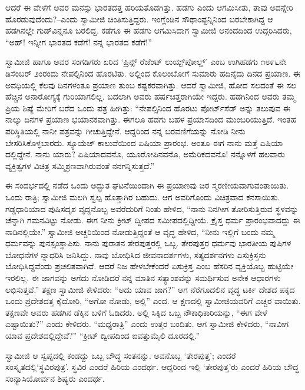 ಆದರೆ ಈ ವೇಳೆಗೆ ಅವರ ಮನಸ್ಸು ಭಾರತದತ್ತ ಹರಿಯತೊಡಗಿತ್ತು. ಹಡಗು ಎಂದು ಆಗಮಿಸೀತು, ತಾವು ಅದನ್ನೇರಿ ಹೊರಡುವುದೆಂದು?–ಎಂದು ಸ್ವಾಮೀಜಿ ಚಿಂತಿಸುತ್ತಿದ್ದರು. ಇಂಗ್ಲೆಂಡಿನ ಸೌಥಾಂಪ್ಟನ್ನಿನಿಂದ ಬರಬೇಕಾಗಿದ್ದ ಆ ಹಡಗಿನಲ್ಲೇ ಗುಡ್​ವಿನ್ನನೂ ಬರಲಿದ್ದ. ಕಡೆಗೂ ಈ ಹಡಗು ಆಗಮಿಸಿದಾಗ ಸ್ವಾಮೀಜಿ ಆನಂದದಿಂದ ಉದ್ಗರಿಸಿದರು, “ಅಹ್! ಇನ್ನೀಗ ಭಾರತದ ಕಡೆಗೆ! ನನ್ನ ಭಾರತದ ಕಡೆಗೆ!”

ಸ್ವಾಮೀಜಿ ಹಾಗೂ ಅವರ ಸಂಗಡಿಗರು ಏರಿದ ‘ಪ್ರಿನ್ಸ್ ರೆಜೆಂಟ್ ಲುಯ್ಟ್​ಪೋಲ್ಡ್​’ ಎಂಬ ಉಗಿಹಡಗು ೧೮೯೬ನೇ ಡಿಸೆಂಬರ್ ೨ಂರಂದು ನೇಪಲ್ಸಿನಿಂದ ಹೊರಟಿತು. ಅಲ್ಲಿಂದ ಕೊಲಂಬೋಗೆ ಸುಮಾರು ಹದಿನೈದು ದಿನದ ಪ್ರಯಾಣ. ಈ ಅವಧಿಯಲ್ಲಿ ಕೆಲವು ದಿನಗಳಂತೂ ಪ್ರಯಾಣ ತುಂಬ ಕಷ್ಟಕರವಾಗಿತ್ತು. ಆದರೆ ಸ್ವಾಮೀಜಿ, ಹೋದ ಸಲದಂತೆ ಈ ಸಲ ಹೆಚ್ಚಿನ ಅನಾರೋಗ್ಯಕ್ಕೆ ಗುರಿಯಾಗಲಿಲ್ಲ. ಬದಲಾಗಿ ಅವರು ಹರ್ಷಚಿತ್ತರಾಗಿಯೇ ಇದ್ದರು. ಹಡಗಿನಿಂದ ಅವರು ತಮ್ಮ ಪ್ರಿಯ ಶಿಷ್ಯೆ ಮೇರಿಗೆ ಬರೆದ ಒಂದು ಪತ್ರ ಹೀಗಿತ್ತು: “ನೇಪಲ್ಸಿನಿಂದ ಹೊರಟು ಪೋರ್ಟ್​ಸೆಡ್ ಅನ್ನು ತಲುಪುವ ಈ ನಾಲ್ಕು ದಿನಗಳ ಪ್ರಯಾಣ ಭಯಾನಕವಾಗಿತ್ತು. ಈಗಲೂ ಹಡಗು ಬಹಳ ಪ್ರಯಾಸದಿಂದ ಮುಂಬರಿಯುತ್ತಿದೆ. ಇಂತಹ ಪರಿಸ್ಥಿತಿಯಲ್ಲಿ ನಾನೀ ಪತ್ರವನ್ನು ಗೀಚುತ್ತಿದ್ದೇನೆ. ಆದ್ದರಿಂದ ನನ್ನ ಬರವಣಿಗೆಯನ್ನು ನೋಡಿ ನೀನು ಬೇಸರಿಸಿಕೊಳ್ಳಬಾರದು. ಸ್ಯೂಯೆಜ್ ಕಾಲುವೆಯಿಂದ ಏಷಿಯಾ ಪ್ರಾರಂಭ. ಅಂತೂ ಈಗ ನಾನು ಮತ್ತೆ ಏಷಿಯಾ ದಲ್ಲಿದ್ದೇನೆ. ನಾನು ಯಾರು? ಏಷಿಯಾದವನೊ, ಯೂರೋಪಿನವನೊ, ಅಮೆರಿಕದವನೊ! ನನ್ನೊಳಗೆ ಹಲವಾರು ವ್ಯಕ್ತಿತ್ವಗಳ ವಿಚಿತ್ರ ಸಮ್ಮಿಶ್ರಣವಾಗಿರುವಂತೆ ನನಗನ್ನಿಸುತ್ತದೆ.”

ಈ ಸಂದರ್ಭದಲ್ಲಿ ನಡೆದ ಒಂದು ಅದ್ಭುತ ಘಟನೆಯಿಂದಾಗಿ ಈ ಪ್ರಯಾಣವು ಚಿರ ಸ್ಮರಣೀಯವಾಗುವಂತಾಯಿತು. ಒಂದು ರಾತ್ರಿ; ಸ್ವಾಮೀಜಿ ಮಲಗಿ ಸ್ವಲ್ಪ ಹೊತ್ತಾಗಿರ ಬಹುದು. ಆಗ ಅವರಿಗೊಂದು ವಿಚಿತ್ರವಾದ ಕನಸಾಯಿತು. ಗಡ್ಡಧಾರಿಯಾದ ಪುಷಿಸದೃಶ ವೃದ್ದನೊಬ್ಬ ಅವರೆದುರಿಗೆ ನಿಂತು ಹೇಳಿದ, “ನಾನು ನಿನಗೀಗ ತೋರಿಸುತ್ತಿರುವ ಸ್ಥಳವನ್ನು ಚೆನ್ನಾಗಿ ಗಮನವಿಟ್ಟು ನೋಡು. ಈಗ ನೀನು ಕ್ರೀಟ್ ದ್ವೀಪದ ಸಮೀಪದಲ್ಲಿದ್ದೀಯೆ. ಕ್ರೈಸ್ತ ಧರ್ಮ ಪ್ರಾರಂಭವಾದದ್ದು ಈ ನಾಡಿನಲ್ಲಿಯೇ.” ಸ್ವಾಮೀಜಿ ಅಚ್ಚರಿಯಿಂದ ನೋಡುತ್ತಿದ್ದಂತೆ ಆ ವೃದ್ಧ ಹೇಳಿದ, “ನೀನು ಇಲ್ಲಿಗೆ ಬಂದು ನಮ್ಮ ಧರ್ಮವನ್ನು ಪುನಸ್ಸಂಸ್ಥಾಪಿಸು. ನಾನು ಪುರಾತನ ತೇರಪುತ್ತರಲ್ಲಿ ಒಬ್ಬ. ತೇರಪುತ್ತರ ಧರ್ಮವು ಭಾರತೀಯ ಪುಷಿಗಳ ಬೋಧನೆಗಳ ನ್ನಾಧರಿಸಿ ಜನಿಸಿದ್ದು. ನಾವು ಬೋಧಿಸಿದ ಜೀವನಾದರ್ಶಗಳು, ಸತ್ಯದರ್ಶನಗಳು ಏಸುಕ್ರಿಸ್ತನು ಬೋಧಿಸಿದ್ದವೆಂದು ಪ್ರಚಲಿತವಾಗಿವೆ. ಆದರೆ ನಿಜ ಹೇಳಬೇಕೆಂದರೆ ಏಸುಕ್ರಿಸ್ತ ಎಂಬ ಹೆಸರಿನ ವ್ಯಕ್ತಿಯೊಬ್ಬ ಹುಟ್ಟಿಯೇ ಇರಲಿಲ್ಲ. ಈ ಜಾಗವನ್ನು ಅಗೆದು ನೋಡಿದರೆ ನನ್ನ ಮಾತಿನ ಸತ್ಯಾಂಶವನ್ನು ಸಮರ್ಥಿಸುವ ಅನೇಕ ಆಧಾರಗಳು ಲಭಿಸುತ್ತವೆ.” ತಕ್ಷಣ ಸ್ವಾಮೀಜಿ ಕೇಳಿದರು: “ಅದು ಯಾವ ಜಾಗ?” ಆಗ ನೆರೆಗೂದಲಿನ ವೃದ್ಧ ಟರ್ಕಿ ದೇಶದ ಪಕ್ಕದ ಒಂದು ಪ್ರದೇಶದತ್ತ ಕೈದೋರಿ, “ಅಗೋ ನೋಡು, ಅಲ್ಲಿ” ಎಂದ. ಆ ಕ್ಷಣದಲ್ಲಿ ಸ್ವಾಮೀಜಿಯವರಿಗೆ ಎಚ್ಚರ ವಾಯಿತು. ತಕ್ಷಣವೇ ಅವರು ಹಡಗಿನ ಡೆಕ್ಕಿನ ಬಳಿಗೆ ಓಡಿದರು. ಅಲ್ಲಿ ಸಿಕ್ಕಿದ ಒಬ್ಬ ನೌಕಾಧಿಕಾರಿಯನ್ನು, “ಈಗ ವೇಳೆ ಎಷ್ಟಾಯಿತು?” ಎಂದು ಕೇಳಿದರು. “ಮಧ್ಯರಾತ್ರಿ” ಎಂದು ಉತ್ತರ ಬಂದಿತು. ಆಗ ಸ್ವಾಮೀಜಿ ಕೇಳಿದರು, “ನಾವೀಗ ಯಾವ ಪ್ರದೇಶದಲ್ಲಿದ್ದೇವೆ?” “ಕ್ರೀಟ್ ದ್ವೀಪದಿಂದ ಐವತ್ತುಮೈಲಿ ದೂರದಲ್ಲಿ.”

ಸ್ವಾಮೀಜಿ ಆ ಸ್ವಪ್ನದಲ್ಲಿ ಕಂಡದ್ದು ಒಬ್ಬ ಬೌದ್ಧ ಸಂತನನ್ನು. ಅವನೊಬ್ಬ ‘ತೇರಪುತ್ತ’; ಎಂದರೆ ಸಂಸ್ಕೃತದಲ್ಲಿ‘ಸ್ಥವಿರಪುತ್ರ’. ಸ್ಥವಿರ ಎಂದರೆ ಹಿರಿಯ ಎಂದರ್ಥ. ಆದ್ದರಿಂದ ಇಲ್ಲಿ ‘ತೇರಪುತ್ತ’ರು ಎಂದರೆ ಹಿರಿಯ ಬೌದ್ಧ ಸಂನ್ಯಾಸಿಯೋರ್ವನ ಶಿಷ್ಯರು ಎಂದರ್ಥ.

